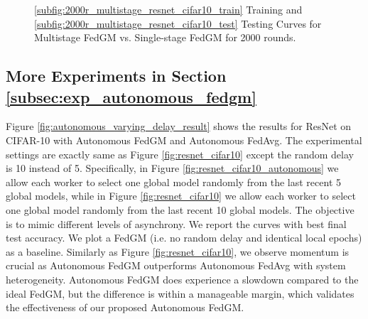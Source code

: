 \begin{figure}[h]
\vspace*{-6pt}
\centering
{}
\vspace*{-6pt}
\caption{\ref{subfig:2000r_multistage_resnet_cifar10_train} Training and \ref{subfig:2000r_multistage_resnet_cifar10_test} Testing Curves for Multistage FedGM vs. Single-stage FedGM for 2000 rounds.}
\label{fig:2000r_multistage_resnet_cifar10}
\end{figure}

\subsection{More Experiments in Section \ref{subsec:exp_autonomous_fedgm}}
\label{subsec:appendix_more_exp_autonomous}

Figure \ref{fig:autonomous_varying_delay_result} shows the results for ResNet on CIFAR-10 with Autonomous FedGM and Autonomous FedAvg. The experimental settings are exactly same as Figure \ref{fig:resnet_cifar10} except the random delay is 10 instead of 5. Specifically, in  Figure \ref{fig:resnet_cifar10_autonomous} we allow each worker to select one global model randomly from the last recent 5 global models, while in Figure \ref{fig:resnet_cifar10} we allow each worker to select one global model randomly from the last recent 10 global models. The objective is to mimic different levels of asynchrony. We report the curves with best final test accuracy. We plot a FedGM (i.e. no random delay and identical local epochs) as a baseline. Similarly as Figure \ref{fig:resnet_cifar10}, we observe momentum is crucial as Autonomous FedGM outperforms Autonomous FedAvg with system heterogeneity. Autonomous FedGM does experience a slowdown compared to the ideal FedGM, but the difference is within a manageable margin, which validates the effectiveness of our proposed Autonomous FedGM.

